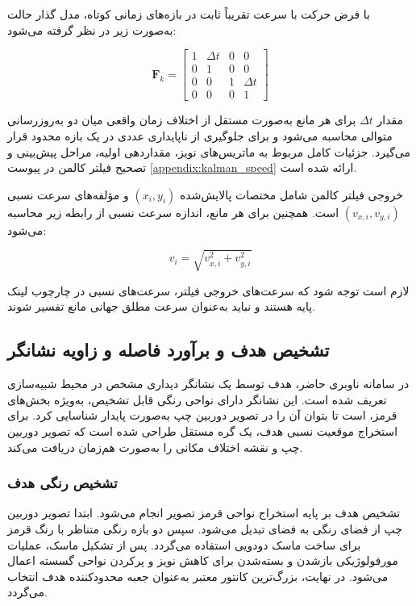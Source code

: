 با فرض حرکت با سرعت تقریباً ثابت در بازه‌های زمانی کوتاه، مدل گذار حالت به‌صورت زیر در نظر گرفته می‌شود:

\begin{equation}
	\mathbf{F}_k =
	\begin{bmatrix}
		1 & \Delta t & 0 & 0 \\
		0 & 1        & 0 & 0 \\
		0 & 0        & 1 & \Delta t \\
		0 & 0        & 0 & 1
	\end{bmatrix}
	\label{eq:kalman_transition_obstacle}
\end{equation}

مقدار \(\Delta t\) برای هر مانع به‌صورت مستقل از اختلاف زمان واقعی میان دو به‌روزرسانی متوالی محاسبه می‌شود و برای جلوگیری از ناپایداری عددی در یک بازه محدود قرار می‌گیرد. جزئیات کامل مربوط به ماتریس‌های نویز، مقداردهی اولیه، مراحل پیش‌بینی و تصحیح فیلتر کالمن در پیوست \ref{appendix:kalman_speed} ارائه شده است.

خروجی فیلتر کالمن شامل مختصات پالایش‌شده \((x_i,y_i)\) و مؤلفه‌های سرعت نسبی \((v_{x,i},v_{y,i})\) است. همچنین برای هر مانع، اندازه سرعت نسبی از رابطه زیر محاسبه می‌شود:

\begin{equation}
	v_i =
	\sqrt{
		v_{x,i}^{2}
		+
		v_{y,i}^{2}
	}
	\label{eq:obstacle_speed}
\end{equation}

لازم است توجه شود که سرعت‌های خروجی فیلتر، سرعت‌های نسبی در چارچوب لینک پایه هستند و نباید به‌عنوان سرعت مطلق جهانی مانع تفسیر شوند.
\subsection{تشخیص هدف و برآورد فاصله و زاویه نشانگر}
\label{subsec:goal_marker_detection}

در سامانه ناوبری حاضر، هدف توسط یک نشانگر دیداری مشخص در محیط شبیه‌سازی تعریف شده است. این نشانگر دارای نواحی رنگی قابل تشخیص، به‌ویژه بخش‌های قرمز، است تا بتوان آن را در تصویر دوربین چپ به‌صورت پایدار شناسایی کرد. برای استخراج موقعیت نسبی هدف، یک گره مستقل طراحی شده است که تصویر دوربین چپ و نقشه اختلاف مکانی را به‌صورت هم‌زمان دریافت می‌کند.

\subsubsection{تشخیص رنگی هدف}

تشخیص هدف بر پایه استخراج نواحی قرمز تصویر انجام می‌شود. ابتدا تصویر دوربین چپ از فضای رنگی  به فضای  تبدیل می‌شود. سپس دو بازه رنگی متناظر با رنگ قرمز برای ساخت ماسک دودویی استفاده می‌گردد. پس از تشکیل ماسک، عملیات مورفولوژیکی بازشدن و بسته‌شدن برای کاهش نویز و پرکردن نواحی گسسته اعمال می‌شود. در نهایت، بزرگ‌ترین کانتور معتبر به‌عنوان جعبه محدودکننده هدف انتخاب می‌گردد.

